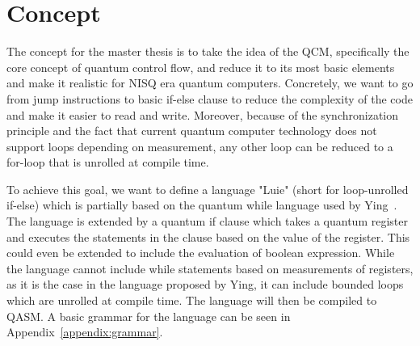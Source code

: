 \chapter{Concept}

The concept for the master thesis is to take the idea of the QCM, specifically the core concept of quantum control flow, and reduce it to its most basic elements and make it realistic for NISQ era quantum computers. Concretely, we want to go from jump instructions to basic if-else clause to reduce the complexity of the code and make it easier to read and write. Moreover, because of the synchronization principle and the fact that current quantum computer technology does not support loops depending on measurement, any other loop can be reduced to a for-loop that is unrolled at compile time.

To achieve this goal, we want to define a language "Luie" (short for loop-unrolled if-else) which is partially based on the quantum while language used by Ying~\cite{Ying11}. The language is extended by a quantum if clause which takes a quantum register and executes the statements in the clause based on the value of the register. This could even be extended to include the evaluation of boolean expression. While the language cannot include while statements based on measurements of registers, as it is the case in the language proposed by Ying, it can include bounded loops which are unrolled at compile time. The language will then be compiled to QASM. A basic grammar for the language can be seen in Appendix~\ref{appendix:grammar}.



